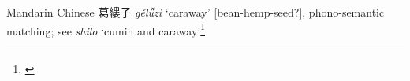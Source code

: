 \begin{etymology}\label{ety:geluzi}
Mandarin Chinese {葛縷子} \textit{gě​lǚ​zi} `caraway' [bean-hemp-seed?], phono-semantic matching; see \textit{shilo} `cumin and caraway'\footnote{\textcite[100]{kleeman_oxford_2010}}
\end{etymology}